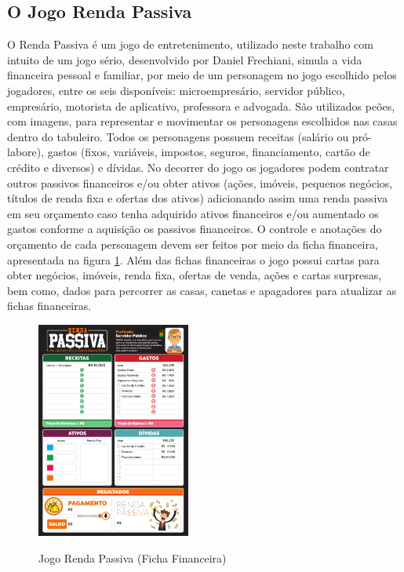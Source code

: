 \subsection{O Jogo Renda Passiva}
O Renda Passiva é um jogo de entretenimento, utilizado neste trabalho com intuito de um jogo sério, desenvolvido por Daniel Frechiani, simula a vida financeira pessoal e familiar, por meio de um personagem no jogo escolhido pelos jogadores, entre os seis disponíveis: microempresário, servidor público, empresário, motorista de aplicativo, professora e advogada. São utilizados peões, com imagens, para representar e movimentar os personagens escolhidos nas casas dentro do tabuleiro. Todos os personagens possuem receitas (salário ou pró-labore), gastos (fixos, variáveis, impostos, seguros, financiamento, cartão de crédito e diversos) e dívidas. No decorrer do jogo os jogadores podem contratar outros passivos financeiros e/ou obter ativos (ações, imóveis, pequenos negócios, títulos de renda fixa e ofertas dos ativos) adicionando assim uma renda passiva em seu orçamento caso tenha adquirido ativos financeiros e/ou aumentado os gastos conforme a aquisição os passivos financeiros. O controle e anotações do orçamento de cada personagem devem ser feitos por meio da ficha financeira, apresentada na figura \ref{fig: figura07-ficha-financeira}. Além das fichas financeiras o jogo possui cartas para obter negócios, imóveis, renda fixa, ofertas de venda, ações e cartas surpresas, bem como, dados para percorrer as casas, canetas e apagadores para atualizar as fichas financeiras.

\graphicspath{{figuras/}}
\begin{figure}[!ht]
\centering
\begin{minipage}{1.\textwidth}
\caption{Jogo Renda Passiva (Ficha Financeira)}
\centering
\includegraphics[width=0.45\textwidth]{07-figura_ficha-financeira-renda-passiva}
\label{fig: figura07-ficha-financeira}
\end{minipage}
\end{figure}

